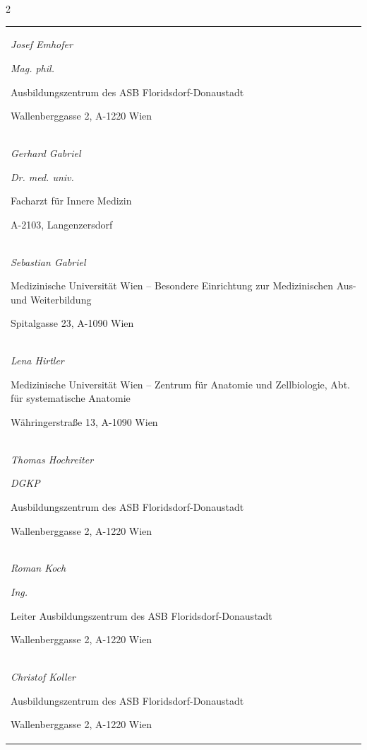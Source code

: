 \documentclass{article}
\begin{document}
\begin{multicols}{2}
\begin{center}
\begin{tabular}{m{6.813cm}}
{\mdseries\itshape Josef Emhofer}

{\mdseries\itshape Mag. phil.}

{\mdseries Ausbildungszentrum des ASB Floridsdorf-Donaustadt}

{\mdseries Wallenberggasse 2, A-1220 Wien}

\\
{\mdseries\itshape Gerhard Gabriel}

{\mdseries\itshape Dr. med. univ. }

{\mdseries Facharzt f\"ur Innere Medizin}

{\mdseries A-2103, Langenzersdorf}

\\
{\mdseries\itshape Sebastian Gabriel}

{\mdseries Medizinische Universit\"at Wien -- Besondere Einrichtung zur
Medizinischen Aus- und Weiterbildung}

{\mdseries Spitalgasse 23, A-1090 Wien}

\\
{\mdseries\itshape Lena Hirtler}

{\mdseries Medizinische Universit\"at Wien -- Zentrum f\"ur Anatomie und
Zellbiologie, Abt. f\"ur systematische Anatomie}

{\mdseries W\"ahringerstra{\ss}e 13, A-1090 Wien }

\\
{\mdseries\itshape Thomas Hochreiter}

{\mdseries\itshape DGKP}

{\mdseries Ausbildungszentrum des ASB Floridsdorf-Donaustadt}

{\mdseries Wallenberggasse 2, A-1220 Wien}

\\
{\mdseries\itshape Roman Koch}

{\mdseries\itshape Ing.}

{\mdseries Leiter Ausbildungszentrum des ASB Floridsdorf-Donaustadt}

{\mdseries Wallenberggasse 2, A-1220 Wien}

\\
{\mdseries\itshape Christof Koller}

{\mdseries Ausbildungszentrum des ASB Floridsdorf-Donaustadt}

{\mdseries Wallenberggasse 2, A-1220 Wien}


\end{tabular}
\end{center}
\end{multicols}
\end{document}
